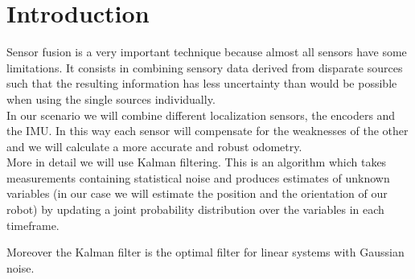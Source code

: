 \chapter{Introduction}\label{intro_sensor_fusion}

Sensor fusion is a very important technique because almost all sensors have some limitations. It consists in combining sensory data derived from disparate sources such that the resulting information has less uncertainty than would be possible when using the single sources individually.\\

In our scenario we will combine different localization sensors, the encoders and the IMU. In this way each sensor will compensate for the weaknesses of the other and we will calculate a more accurate and robust odometry.\\

More in detail we will use Kalman filtering. This is an algorithm which takes measurements containing statistical noise and produces estimates of unknown variables (in our case we will estimate the position and the orientation of our robot) by updating a joint probability distribution over the variables in each timeframe.

Moreover the Kalman filter is the optimal filter for linear systems with Gaussian noise.

